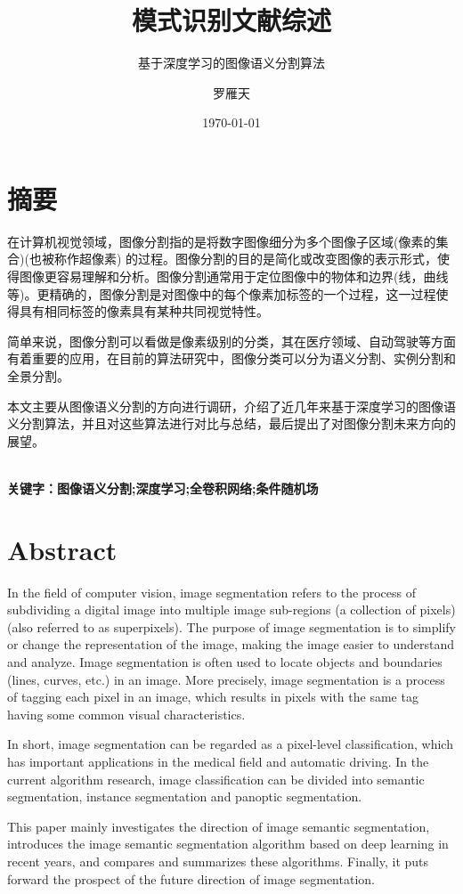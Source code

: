 \documentclass[cn]{elegantbook}
\title{模式识别文献综述}
\subtitle{基于深度学习的图像语义分割算法}
\author{罗雁天}
\institute{清华大学电子系}
\date{\today}
\begin{document}
\maketitle
\tableofcontents
\mainmatter
\hypersetup{pageanchor=true}
\chapter*{摘要}
在计算机视觉领域，图像分割指的是将数字图像细分为多个图像子区域(像素的集合)(也被称作超像素) 的过程。图像分割的目的是简化或改变图像的表示形式，使得图像更容易理解和分析。图像分割通常用于定位图像中的物体和边界(线，曲线等)。更精确的，图像分割是对图像中的每个像素加标签的一个过程，这一过程使得具有相同标签的像素具有某种共同视觉特性。

简单来说，图像分割可以看做是像素级别的分类，其在医疗领域、自动驾驶等方面有着重要的应用，在目前的算法研究中，图像分类可以分为语义分割、实例分割和全景分割。

本文主要从图像语义分割的方向进行调研，介绍了近几年来基于深度学习的图像语义分割算法，并且对这些算法进行对比与总结，最后提出了对图像分割未来方向的展望。

~\\

\noindent\textbf{关键字：图像语义分割;深度学习;全卷积网络;条件随机场}

\chapter*{Abstract}
In the field of computer vision, image segmentation refers to the process of subdividing a digital image into multiple image sub-regions (a collection of pixels) (also referred to as superpixels). The purpose of image segmentation is to simplify or change the representation of the image, making the image easier to understand and analyze. Image segmentation is often used to locate objects and boundaries (lines, curves, etc.) in an image. More precisely, image segmentation is a process of tagging each pixel in an image, which results in pixels with the same tag having some common visual characteristics.

In short, image segmentation can be regarded as a pixel-level classification, which has important applications in the medical field and automatic driving. In the current algorithm research, image classification can be divided into semantic segmentation, instance segmentation and panoptic segmentation.

This paper mainly investigates the direction of image semantic segmentation, introduces the image semantic segmentation algorithm based on deep learning in recent years, and compares and summarizes these algorithms. Finally, it puts forward the prospect of the future direction of image segmentation.
\end{document}
